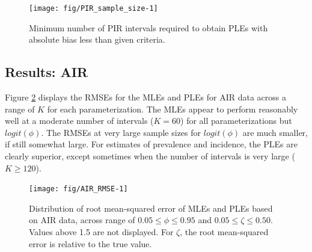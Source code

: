 \documentclass[man, noextraspace, floatsintext]{apa6}\usepackage[]{graphicx}\usepackage[]{color}
\newenvironment{knitrout}{}{} %
\begin{document}
\begin{knitrout}
\color{fgcolor}\begin{figure}[tb]

{\centering \texttt{[image: fig/PIR\_sample\_size-1]} 

}

\caption[Minimum number of PIR intervals required to obtain PLEs with absolute bias less than given criteria]{Minimum number of PIR intervals required to obtain PLEs with absolute bias less than given criteria.}\label{fig:PIR_sample_size}
\end{figure}


\end{knitrout}

\subsection{Results: AIR}
Figure \ref{fig:AIR_RMSE} displays the RMSEs for the MLEs and PLEs for AIR data across a range of $K$ for each parameterization. The MLEs appear to perform reasonably well at a moderate number of intervals ($K = 60$) for all parameterizations but $logit(\phi)$. The RMSEs at very large sample sizes for $logit(\phi)$ are much smaller, if still somewhat large. For estimates of prevalence and incidence, the PLEs are clearly superior, except sometimes when the number of intervals is very large ($K \geq 120$).

\begin{knitrout}
\color{fgcolor}\begin{figure}[tb]

{\centering \texttt{[image: fig/AIR\_RMSE-1]} 

}

\caption[Distribution of root mean-squared error of MLEs and PLEs based on AIR data, across range of ]{Distribution of root mean-squared error of MLEs and PLEs based on AIR data, across range of $0.05 \leq \phi \leq 0.95$ and $0.05 \leq \zeta \leq 0.50$. Values above 1.5 are not displayed. For $\zeta$, the root mean-squared error is relative to the true value.}\label{fig:AIR_RMSE}
\end{figure}


\end{knitrout}
\end{document}
